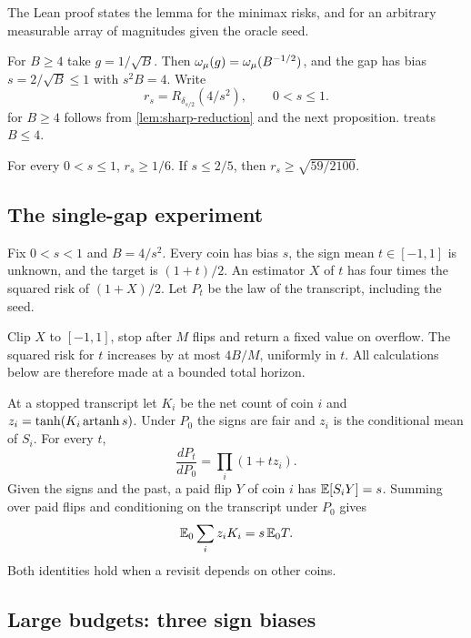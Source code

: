 The Lean proof
 states the lemma
for the minimax risks, and
 for an
arbitrary measurable array of magnitudes given the oracle seed.

For $B\ge4$ take $g=1/\sqrt B$. Then $\omega_\mu(g)=\omega_\mu(B^{-1/2})$, and the gap
has bias $s=2/\sqrt B\le1$ with $s^2B=4$. Write
\[
 r_s=R_{\delta_{s/2}}(4/s^2),\qquad 0<s\le1.
\]
 for $B\ge4$ follows from \cref{lem:sharp-reduction}
and the next proposition.  treats $B\le4$.

\begin{proposition}\label{prop:sharp-critical}
For every $0<s\le1$, $r_s\ge1/6$. If $s\le2/5$, then
$r_s\ge\sqrt{59/2100}$.
\end{proposition}

\subsection{The single-gap experiment}\label{sec:sharp-single}

Fix $0<s<1$ and $B=4/s^2$. Every coin has bias $s$, the sign mean
$t\in[-1,1]$ is unknown, and the target is $(1+t)/2$. An estimator $X$ of
$t$ has four times the squared risk of $(1+X)/2$. Let $P_t$ be the law of
the transcript, including the seed.

Clip $X$ to $[-1,1]$, stop after $M$ flips and return a fixed value on
overflow. The squared risk for $t$ increases by at most $4B/M$, uniformly
in $t$. All calculations below are therefore made at a bounded total
horizon.

At a stopped transcript let $K_i$ be the net count of coin $i$ and
$z_i=\tanh(K_i\operatorname{artanh} s)$. Under $P_0$ the signs are fair and $z_i$ is the
conditional mean of $S_i$. For every $t$,
\begin{equation}\label{eq:sharp-likelihood}
 \frac{dP_t}{dP_0}=\prod_i(1+tz_i).
\end{equation}
Given the signs and the past, a paid flip $Y$ of coin $i$ has
$\mathbb E[S_iY]=s$. Summing over paid flips and conditioning on the transcript
under $P_0$ gives
\begin{equation}\label{eq:sharp-wald}
 \mathbb E_0\sum_i z_iK_i=s\,\mathbb E_0T .
\end{equation}
Both identities hold when a revisit depends on other coins.

\subsection{Large budgets: three sign biases}\label{sec:sharp-large}

